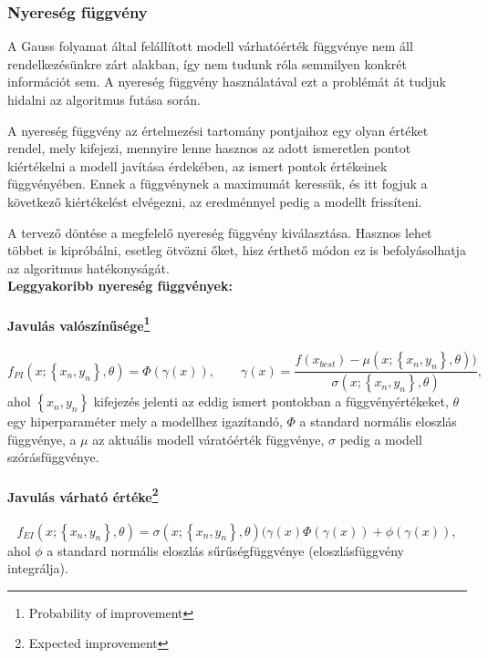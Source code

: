 \subsubsection{Nyereség függvény}

A Gauss folyamat által felállított modell várhatóérték függvénye nem áll rendelkezésünkre zárt alakban, így nem tudunk róla semmilyen konkrét információt sem. A nyereség függvény használatával ezt a problémát át tudjuk hidalni az algoritmus futása során. 

A nyereség függvény az értelmezési tartomány pontjaihoz egy olyan értéket rendel, mely kifejezi, mennyire lenne hasznos az adott ismeretlen pontot kiértékelni a modell javítása érdekében, az ismert pontok értékeinek függvényében. Ennek a függvénynek a maximumát keressük, és itt fogjuk a következő kiértékelést elvégezni, az eredménnyel pedig a modellt frissíteni.

A tervező döntése a megfelelő nyereség függvény kiválasztása. Hasznos lehet többet is kipróbálni, esetleg ötvözni őket, hisz érthető módon ez is befolyásolhatja az algoritmus hatékonyságát.\\[3mm]
\textbf{Leggyakoribb nyereség függvények\cite{AcqFgvCikk}:}
\paragraph[Javulás valószínűsége]{Javulás valószínűsége\footnote{Probability of improvement}}
\begin{equation}
	\label{eq:POI}
	f_{PI}(x;\left\lbrace x_n,y_n\right\rbrace ,\theta)=\Phi(\gamma(x)), \qquad \gamma(x)=\frac{f(x_{best})-\mu(x;\left\lbrace x_n,y_n\right\rbrace ,\theta))}{\sigma(x; \left\lbrace x_n,y_n\right\rbrace ,\theta)},
\end{equation}
ahol $\left\lbrace x_n,y_n\right\rbrace$  kifejezés jelenti az eddig ismert pontokban a függvényértékeket, $\theta$ egy hiperparaméter mely a modellhez igazítandó, $\Phi$ a standard normális eloszlás függvénye, a  $\mu$ az aktuális modell váratóérték függvénye, $\sigma$ pedig a modell szórásfüggvénye.
\paragraph[Javulás várható értéke]{Javulás várható értéke\footnote{Expected improvement}}
\begin{equation}
	\label{eq:EI}
	f_{EI}(x;\left\lbrace x_n,y_n\right\rbrace ,\theta)=\sigma(x;\left\lbrace x_n,y_n\right\rbrace ,\theta)(\gamma(x)\Phi(\gamma(x))+\phi(\gamma(x)),
\end{equation}
ahol $\phi$ a standard normális eloszlás sűrűségfüggvénye (eloszlásfüggvény integrálja).
